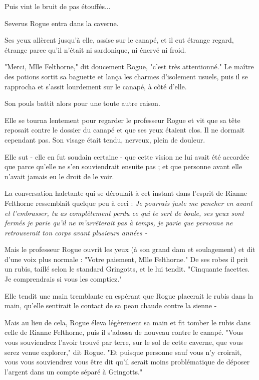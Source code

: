 Puis vint le bruit de pas étouffés...

Severus Rogue entra dans la caverne.

Ses yeux allèrent jusqu'à elle, assise sur le canapé, et il eut étrange regard, étrange parce qu'il n'était ni sardonique, ni énervé ni froid.

"Merci, Mlle Felthorne," dit doucement Rogue, "c'est très attentionné." Le maître des potions sortit sa baguette et lança les charmes d'isolement usuels, puis il se rapprocha et s'assit lourdement sur le canapé, à côté d'elle.

Son pouls battit alors pour une toute autre raison.

Elle se tourna lentement pour regarder le professeur Rogue et vit que sa tête reposait contre le dossier du canapé et que ses yeux étaient clos. Il ne dormait cependant pas. Son visage était tendu, nerveux, plein de douleur.

Elle sut - elle en fut soudain certaine - que cette vision ne lui avait été accordée que parce qu'elle ne s'en souviendrait ensuite pas ; et que personne avant elle n'avait jamais eu le droit de le voir.

La conversation haletante qui se déroulait à cet instant dans l'esprit de Rianne Felthorne ressemblait quelque peu à ceci : \emph{Je pourrais juste me pencher en avant et l'embrasser, tu as complètement perdu ce qui te sert de boule, ses yeux sont fermés je parie qu'il ne m'arrêterait pas à temps, je parie que personne ne retrouverait ton corps avant plusieurs années -} 

Mais le professeur Rogue ouvrit les yeux (à son grand dam et soulagement) et dit d'une voix plus normale : "Votre paiement, Mlle Felthorne." De ses robes il prit un rubis, taillé selon le standard Gringotts, et le lui tendit. "Cinquante facettes. Je comprendrais si vous les comptiez."

Elle tendit une main tremblante en espérant que Rogue placerait le rubis dans la main, qu'elle sentirait le contact de sa peau chaude contre la sienne -

Mais au lieu de cela, Rogue éleva légèrement sa main et fit tomber le rubis dans celle de Rianne Felthorne, puis il s'adossa de nouveau contre le canapé. "Vous vous souviendrez l'avoir trouvé par terre, sur le sol de cette caverne, que vous serez venue explorer," dit Rogue. "Et puisque personne sauf vous n'y croirait, vous vous souviendrez vous être dit qu'il serait moins problématique de déposer l'argent dans un compte séparé à Gringotts."

